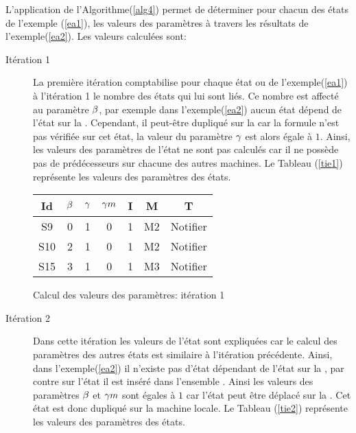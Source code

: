 \begin{Exemple}\label{ea3}
	L'application de l'Algorithme(\ref{alg4}) permet de déterminer pour chacun des états de l'exemple (\ref{ea1}), les valeurs des paramètres à travers les résultats de l'exemple(\ref{ea2}). Les valeurs calculées sont: 
	
\begin{description}
	\item[Itération 1] La première itération comptabilise pour chaque état  ou  de l'exemple(\ref{ea1}) à l'itération 1 le nombre des états  qui lui sont liés. Ce nombre est affecté au paramètre  $\beta{}$, par exemple dans l'exemple(\ref{ea2}) aucun état dépend de l'état  sur la \mtwo{}. Cependant, il peut-être dupliqué sur la \mone{} car la formule n'est pas vérifiée sur cet état, la valeur du paramètre $\gamma{}$  est alors égale à $1$. Ainsi, les valeurs des paramètres de l'état  ne sont pas calculés car il ne possède pas de prédécesseurs sur chacune des autres machines.
Le Tableau (\ref{tie1}) représente les valeurs des paramètres  des états.	
\begin{tableth}
	\centering
	\begin{tabular}{|*{7}{c|}}
		\hline
		Id&$\beta{}$&	$\gamma{}$	&$\gamma m{}$ &	I&	M&	T\\ \hline
		S9&		0&	1	&0&	1&	M2&	Notifier\\ \hline
		S10&	2&	1	&0&	1&	M2&	Notifier\\ \hline
		S15&	3&	1	&0&	1&	M3&	Notifier\\ \hline		
	\end{tabular}
	\caption{Calcul des valeurs des paramètres: itération 1}\label{tie1}
\end{tableth}
\item[Itération 2] Dans cette itération les valeurs de l'état  sont expliquées car le calcul des paramètres des autres états est similaire à l'itération précédente. Ainsi, dans l'exemple(\ref{ea2}) il n'existe pas d'état dépendant de l'état  sur la \mtwo{}, par contre sur l'état  il est inséré dans l'ensemble . Ainsi les valeurs des paramètres $\beta{}$ et $\gamma m{}$  sont égales à $1$ car l'état  peut être déplacé sur la \mtwo{}. Cet état est donc dupliqué sur la machine locale. 
Le Tableau (\ref{tie2}) représente les valeurs des paramètres  des états.
\begin{tableth}
	\centering
	\begin{tabular}{|*{7}{c|}}

\end{tabular}
\end{tableth}
\end{description}
\end{Exemple}
